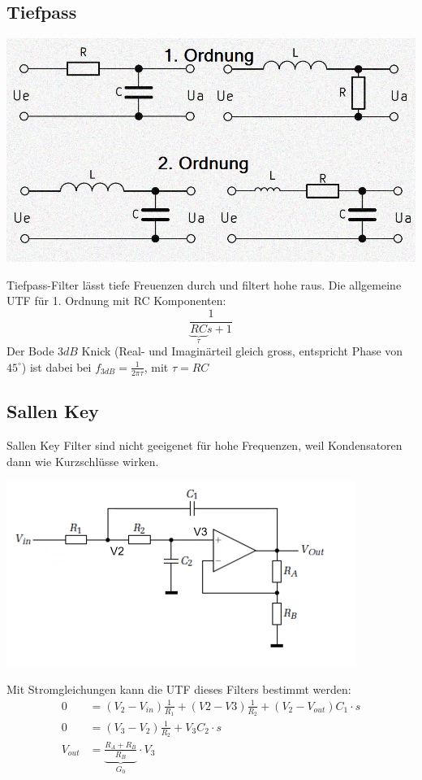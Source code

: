 \subsection{Tiefpass}
\begin{minipage}{0.20\textwidth}
	\includegraphics[angle=90,origin=c,width=0.8\linewidth,keepaspectratio=true]{./Images/filter_tiefpass}
\end{minipage}%
\begin{minipage}{0.30\textwidth}
	Tiefpass-Filter lässt tiefe Freuenzen durch und filtert hohe raus. Die allgemeine UTF für 1. Ordnung mit RC Komponenten:
	\[
	\frac{1}{\underbrace{RC}_{\tau}s + 1}
	\]
	Der Bode $3dB$ Knick (Real- und Imaginärteil gleich gross, entspricht Phase von $45^\circ$) ist dabei bei $f_{3dB} = \frac{1}{2\pi\tau}$, mit $\tau = RC$
\end{minipage}


\subsection{Sallen Key}
Sallen Key Filter sind nicht geeigenet für hohe Frequenzen, weil Kondensatoren dann wie Kurzschlüsse wirken.
\begin{center}
	\includegraphics[width=0.7\columnwidth]{Images/sallenkey}
\end{center}
Mit Stromgleichungen kann die UTF dieses Filters bestimmt werden:
\begin{align*}
	0 &= (V_2 - V_{in})\frac{1}{R_1} +(V2 - V3)\frac{1}{R_2} + (V_2 - V_{out})C_1\cdot s \\
	0 &= (V_3 - V_2)\frac{1}{R_2}+ V_3C_2 \cdot s \\
	V_{out} &= \underbrace{\frac{R_A + R_B}{R_B}}_{G_0} \cdot V_3
\end{align*}

